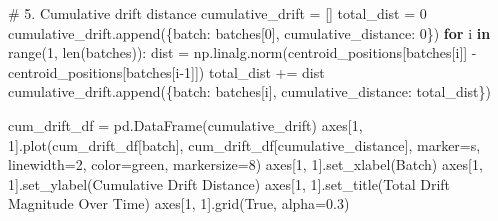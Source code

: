 \documentclass[
  letterpaper,
  DIV=11,
  numbers=noendperiod]{scrartcl}
\newenvironment{Shaded}{\begin{snugshade}}{\end{snugshade}}
\newcommand{\BuiltInTok}[1]{\textcolor[rgb]{0.00,0.23,0.31}{#1}}
\newcommand{\CommentTok}[1]{\textcolor[rgb]{0.37,0.37,0.37}{#1}}
\newcommand{\ControlFlowTok}[1]{\textcolor[rgb]{0.00,0.23,0.31}{\textbf{#1}}}
\newcommand{\DecValTok}[1]{\textcolor[rgb]{0.68,0.00,0.00}{#1}}
\newcommand{\FloatTok}[1]{\textcolor[rgb]{0.68,0.00,0.00}{#1}}
\newcommand{\KeywordTok}[1]{\textcolor[rgb]{0.00,0.23,0.31}{\textbf{#1}}}
\newcommand{\NormalTok}[1]{\textcolor[rgb]{0.00,0.23,0.31}{#1}}
\newcommand{\OperatorTok}[1]{\textcolor[rgb]{0.37,0.37,0.37}{#1}}
\newcommand{\StringTok}[1]{\textcolor[rgb]{0.13,0.47,0.30}{#1}}
\newcommand{\VariableTok}[1]{\textcolor[rgb]{0.07,0.07,0.07}{#1}}
\renewenvironment{Shaded}{%
  \begin{tcolorbox}[%
    enhanced,%
    colback=codebg,%
    colframe=codebg,%
    borderline west={3pt}{0pt}{sectionblue},%
    fontupper=\small\ttfamily,%
    boxrule=0pt,%
    arc=0pt,%
    boxsep=5pt,%
    left=2mm,%
    right=2mm,%
    top=2mm,%
    bottom=2mm%
  ]%
}{%
  \end{tcolorbox}%
}
\begin{document}
\begin{Shaded}
\begin{Highlighting}[]
\CommentTok{\# 5. Cumulative drift distance}
\NormalTok{cumulative\_drift }\OperatorTok{=}\NormalTok{ []}
\NormalTok{total\_dist }\OperatorTok{=} \DecValTok{0}
\NormalTok{cumulative\_drift.append(\{}\StringTok{\textquotesingle{}batch\textquotesingle{}}\NormalTok{: batches[}\DecValTok{0}\NormalTok{], }\StringTok{\textquotesingle{}cumulative\_distance\textquotesingle{}}\NormalTok{: }\DecValTok{0}\NormalTok{\})}
\ControlFlowTok{for}\NormalTok{ i }\KeywordTok{in} \BuiltInTok{range}\NormalTok{(}\DecValTok{1}\NormalTok{, }\BuiltInTok{len}\NormalTok{(batches)):}
\NormalTok{    dist }\OperatorTok{=}\NormalTok{ np.linalg.norm(centroid\_positions[batches[i]] }\OperatorTok{{-}}\NormalTok{ centroid\_positions[batches[i}\OperatorTok{{-}}\DecValTok{1}\NormalTok{]])}
\NormalTok{    total\_dist }\OperatorTok{+=}\NormalTok{ dist}
\NormalTok{    cumulative\_drift.append(\{}\StringTok{\textquotesingle{}batch\textquotesingle{}}\NormalTok{: batches[i], }\StringTok{\textquotesingle{}cumulative\_distance\textquotesingle{}}\NormalTok{: total\_dist\})}

\NormalTok{cum\_drift\_df }\OperatorTok{=}\NormalTok{ pd.DataFrame(cumulative\_drift)}
\NormalTok{axes[}\DecValTok{1}\NormalTok{, }\DecValTok{1}\NormalTok{].plot(cum\_drift\_df[}\StringTok{\textquotesingle{}batch\textquotesingle{}}\NormalTok{], cum\_drift\_df[}\StringTok{\textquotesingle{}cumulative\_distance\textquotesingle{}}\NormalTok{], }
\NormalTok{               marker}\OperatorTok{=}\StringTok{\textquotesingle{}s\textquotesingle{}}\NormalTok{, linewidth}\OperatorTok{=}\DecValTok{2}\NormalTok{, color}\OperatorTok{=}\StringTok{\textquotesingle{}green\textquotesingle{}}\NormalTok{, markersize}\OperatorTok{=}\DecValTok{8}\NormalTok{)}
\NormalTok{axes[}\DecValTok{1}\NormalTok{, }\DecValTok{1}\NormalTok{].set\_xlabel(}\StringTok{\textquotesingle{}Batch\textquotesingle{}}\NormalTok{)}
\NormalTok{axes[}\DecValTok{1}\NormalTok{, }\DecValTok{1}\NormalTok{].set\_ylabel(}\StringTok{\textquotesingle{}Cumulative Drift Distance\textquotesingle{}}\NormalTok{)}
\NormalTok{axes[}\DecValTok{1}\NormalTok{, }\DecValTok{1}\NormalTok{].set\_title(}\StringTok{\textquotesingle{}Total Drift Magnitude Over Time\textquotesingle{}}\NormalTok{)}
\NormalTok{axes[}\DecValTok{1}\NormalTok{, }\DecValTok{1}\NormalTok{].grid(}\VariableTok{True}\NormalTok{, alpha}\OperatorTok{=}\FloatTok{0.3}\NormalTok{)}


\end{Highlighting}
\end{Shaded}
\end{document}

